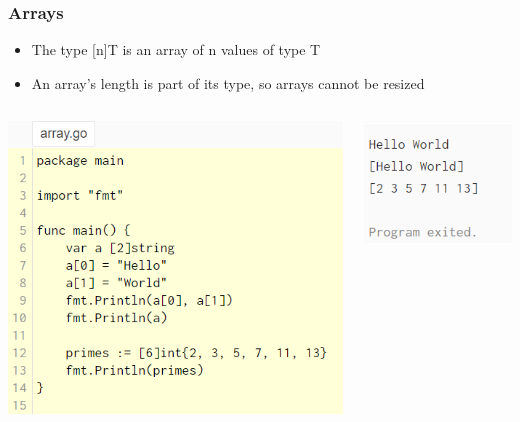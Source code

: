 \documentclass[14pt]{beamer}
\begin{document}
{
\begin{frame}
    \frametitle{Arrays}
    \begin{itemize}
        \item The type [n]T is an array of n values of type T
        \item An array's length is part of its type, so arrays cannot be resized
    \end{itemize}
    \begin{columns}
        \begin{column}{0.5\textwidth}
        \includegraphics[width=\linewidth]{img/array.PNG}
        \end{column}
        \begin{column}{0.5\textwidth}
        \includegraphics[width=0.5\linewidth]{img/arrayoutput.PNG}
        \end{column}
    \end{columns}
\end{frame}
}
\end{document}
